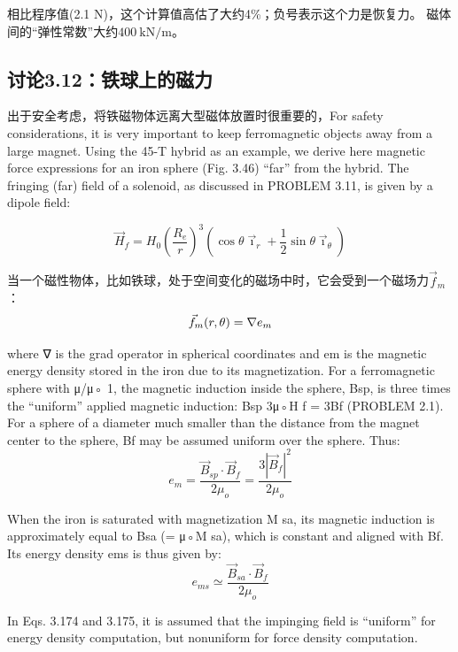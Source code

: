 相比程序值(2.1 N)，这个计算值高估了大约4\%；负号表示这个力是恢复力。
磁体间的“弹性常数”大约$400\ \mathrm{kN/m}$。
\newpage


\subsection{讨论3.12：铁球上的磁力}
出于安全考虑，将铁磁物体远离大型磁体放置时很重要的，For safety considerations, it is very important to keep ferromagnetic objects away
from a large magnet. Using the 45-T hybrid as an example, we derive here magnetic
force expressions for an iron sphere (Fig. 3.46) “far” from the hybrid. The fringing
(far) field of a solenoid, as discussed in PROBLEM 3.11, is given by a dipole field:

\begin{equation}
\vec{H}_{f}=H_{0}(\frac{R_{e}}{r})^{3}(\cos\theta\vec{\imath}_{r}+\frac{1}{2}\sin\theta\vec{\imath}_{\theta})%
\end{equation}

当一个磁性物体，比如铁球，处于空间变化的磁场中时，它会受到一个磁场力$\vec{f}_m$：
\begin{equation}
\vec{f}_{m}(r,\theta)=\nabla e_{m}\\%
\end{equation}

where ∇ is the grad operator in spherical coordinates and em is the magnetic
energy density stored in the iron due to its magnetization. For a ferromagnetic
sphere with μ/μ◦  1, the magnetic induction inside the sphere, Bsp, is three times
the “uniform” applied magnetic induction: Bsp  3μ◦H f = 3Bf (PROBLEM 2.1).
For a sphere of a diameter much smaller than the distance from the magnet center
to the sphere, Bf may be assumed uniform over the sphere. Thus:
\begin{equation}
e_{m}=\frac{\vec{B}_{sp}\cdot\vec{B}_{f}}{2\mu_{o}}=\frac{3|\vec{B}_{f}|^{2}}{2\mu_{o}}%
\end{equation}

When the iron is saturated with magnetization M sa, its magnetic induction is
approximately equal to Bsa (= μ◦M sa), which is constant and aligned with Bf.
Its energy density ems is thus given by:
\begin{equation}
e_{ms}\simeq\frac{\vec{B}_{sa}\cdot\vec{B}_{f}}{2\mu_{o}}%
\end{equation}

In Eqs. 3.174 and 3.175, it is assumed that the impinging field is “uniform” for
energy density computation, but nonuniform for force density computation.

